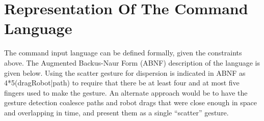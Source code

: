 \section{Representation Of The Command Language}
The command input language can be defined formally, given the constraints above. The Augmented Backus-Naur Form (ABNF) description of the language is given below. Using the scatter gesture for dispersion is indicated in ABNF as 4*5(dragRobot|path) to require that there be at least four and at most five fingers used to make the gesture. 
An alternate approach would be to have the gesture detection coalesce paths and robot drags that were close enough in space and overlapping in time, and present them as a single ``scatter'' gesture. 

\newenvironment{bnfsplit}[1][0.7\textwidth]
{\minipage[t]{#1}$}
{$\endminipage}

